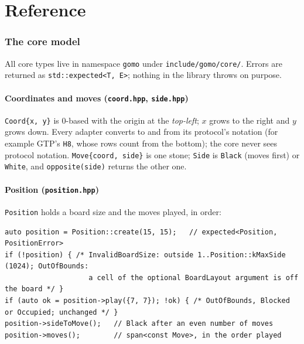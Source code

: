 \documentclass[11pt,a4paper]{article}
\newcommand{\code}[1]{\texttt{#1}}
\newcommand{\file}[1]{\texttt{#1}}
\begin{document}
\part{Reference}

\section{The core model}

All core types live in namespace \code{gomo} under \file{include/gomo/core/}. Errors are
returned as \code{std::expected<T, E>}; nothing in the library throws on purpose.

\subsection{Coordinates and moves (\file{coord.hpp}, \file{side.hpp})}

\code{Coord\{x, y\}} is 0-based with the origin at the \emph{top-left}; $x$ grows to the right and
$y$ grows down. Every adapter converts to and from its protocol's notation (for example GTP's
\code{H8}, whose rows count from the bottom); the core never sees protocol notation.
\code{Move\{coord, side\}} is one stone; \code{Side} is \code{Black} (moves first) or \code{White},
and \code{opposite(side)} returns the other one.

\subsection{Position (\file{position.hpp})}

\code{Position} holds a board size and the moves played, in order:

\begin{lstlisting}
auto position = Position::create(15, 15);   // expected<Position, PositionError>
if (!position) { /* InvalidBoardSize: outside 1..Position::kMaxSide (1024); OutOfBounds:
                    a cell of the optional BoardLayout argument is off the board */ }
if (auto ok = position->play({7, 7}); !ok) { /* OutOfBounds, Blocked or Occupied; unchanged */ }
position->sideToMove();   // Black after an even number of moves
position->moves();        // span<const Move>, in the order played
\end{lstlisting}
\end{document}
